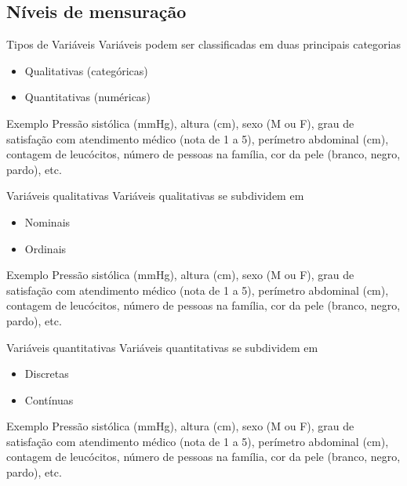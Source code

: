 \documentclass{beamer}
\begin{document}
\subsection{Níveis de mensuração}

\begin{frame}{Tipos de Variáveis}
Variáveis podem ser classificadas em duas principais categorias
  \begin{itemize}
  \item Qualitativas (categóricas)
  \item Quantitativas (numéricas)
  \end{itemize}
  \begin{exampleblock}{Exemplo}
    Pressão sistólica (mmHg), altura (cm), sexo (M ou F), grau de
    satisfação com atendimento médico (nota de 1 a 5), perímetro
    abdominal (cm), contagem de leucócitos, número de pessoas na
    família, cor da pele (branco, negro, pardo), etc.
  \end{exampleblock}
\end{frame}

\begin{frame}{Variáveis qualitativas}
Variáveis qualitativas se subdividem em
  \begin{itemize}
  \item<1-2> Nominais

  \item<3-4> Ordinais
  \end{itemize}


  \begin{exampleblock}{Exemplo}
    Pressão sistólica (mmHg), altura (cm), \alert{sexo (M ou
      F)}, \alert{grau de satisfação com atendimento médico
      (nota de 1 a 5)}, perímetro abdominal (cm), contagem de
    leucócitos, número de pessoas na família, \alert{cor da
      pele (branco, negro, pardo)}, etc.
  \end{exampleblock}
\end{frame}

\begin{frame}{Variáveis quantitativas}
Variáveis quantitativas se subdividem em
  \begin{itemize}
  \item<1-2> Discretas
  \item<3-4> Contínuas
  \end{itemize}
  \begin{exampleblock}{Exemplo}
    \alert{Pressão sistólica (mmHg)}, \alert{altura
      (cm)}, sexo (M ou F), grau de satisfação com atendimento médico
    (nota de 1 a 5), perímetro abdominal (cm), \alert{contagem
      de leucócitos}, \alert{número de pessoas na família},
    cor da pele (branco, negro, pardo), etc.
  \end{exampleblock}
\end{frame}
\end{document}
